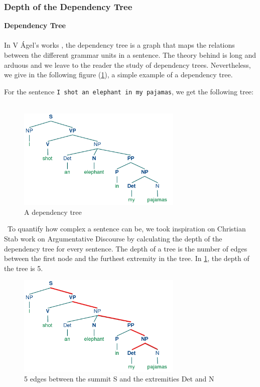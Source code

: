 \subsubsection{Depth of the Dependency Tree}
\textbf{Dependency Tree}
\\
\\
In V {\'A}gel's works \cite{ágel2006dependency}, the dependency tree is a graph that maps the relations between the different grammar units in a sentence. The theory behind is long and arduous and we leave to the reader the study of dependency trees. Nevertheless, we give in the following figure (\ref{fig:deptree}), a simple example of a dependency tree.

For the sentence \texttt{I shot an elephant in my pajamas}, we get the following tree:
\
\begin{figure}[H]
    \centering
    \includegraphics[width=0.7\textwidth]{fig/deptree.png}
    \caption[Short caption]{A dependency tree}
    \label{fig:deptree}
\end{figure}
\
To quantify how complex a sentence can be, we took inspiration on Christian Stab work on Argumentative Discourse \cite{TUD-CS-2014-0882} by calculating the depth of the dependency tree for every sentence. The depth of a tree is the number of edges between the first node and the furthest extremity in the tree. In \cref{fig:deptree}, the depth of the tree is 5.
\
\begin{figure}[H]
    \centering
    \includegraphics[width=0.7\textwidth]{fig/deptreepath.png}
    \caption[Short caption]{5 edges between the summit S and the extremities Det and N}
    \label{fig:deptreepath}
\end{figure}
